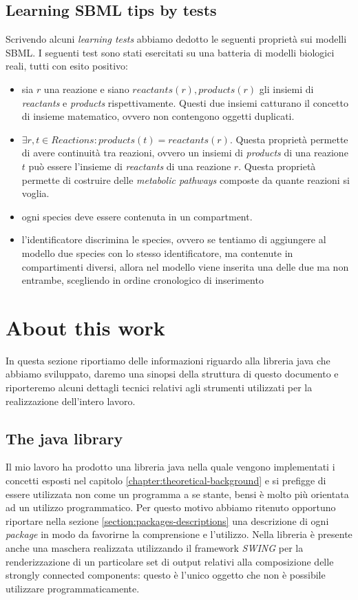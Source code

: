 \subsection{Learning SBML tips by tests}

Scrivendo alcuni \emph{learning tests} abbiamo dedotto le seguenti
propriet\`a sui modelli SBML. I seguenti test sono stati esercitati su
una batteria di modelli biologici reali, tutti con esito positivo:
\begin{itemize}
\item sia $r$ una reazione e siano $reactants(r), products(r)$ gli
  insiemi di \emph{reactants} e \emph{products}
  rispettivamente. Questi due insiemi catturano il concetto di insieme
  matematico, ovvero non contengono oggetti duplicati.
\item $\exists r,t \in Reactions: products(t) = reactants(r)$. Questa
  propriet\`a permette di avere continuit\`a tra reazioni, ovvero un
  insiemi di \emph{products} di una reazione $t$ pu\`o essere
  l'insieme di \emph{reactants} di una reazione $r$. Questa
  propriet\`a permette di costruire delle \emph{metabolic pathways}
  composte da quante reazioni si voglia.
\item ogni species deve essere contenuta in un compartment.
\item l'identificatore discrimina le species, ovvero se tentiamo di
  aggiungere al modello due species con lo stesso identificatore, ma
  contenute in compartimenti diversi, allora nel modello viene
  inserita una delle due ma non entrambe, scegliendo in ordine
  cronologico di inserimento
\end{itemize}

\section{About this work}
In questa sezione riportiamo delle informazioni riguardo alla libreria
java che abbiamo sviluppato, daremo una sinopsi della struttura di
questo documento e riporteremo alcuni dettagli tecnici relativi agli
strumenti utilizzati per la realizzazione dell'intero lavoro.

\subsection{The java library}
Il mio lavoro ha prodotto una libreria java nella quale vengono
implementati i concetti esposti nel capitolo
\ref{chapter:theoretical-background} e si prefigge di essere
utilizzata non come un programma a se stante, bensi \`e molto pi\`u
orientata ad un utilizzo programmatico. Per questo motivo abbiamo
ritenuto opportuno riportare nella sezione
\ref{section:packages-descriptions} una descrizione di ogni
\emph{package} in modo da favorirne la comprensione e
l'utilizzo. Nella libreria \`e presente anche una maschera realizzata
utilizzando il framework \emph{SWING} per la renderizzazione di un
particolare set di output relativi alla composizione delle strongly
connected components: questo \`e l'unico oggetto che non \`e possibile
utilizzare programmaticamente.

